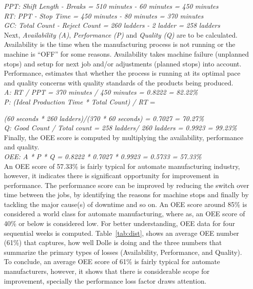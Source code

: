 \documentclass[runningheads]{llncs}
\begin{document}
\emph{PPT: Shift Length - Breaks = 510 minutes - 60 minutes = 450 minutes}\\

\emph{RT: PPT - Stop Time = 450 minutes - 80 minutes = 370 minutes}\\

\emph{GC: Total Count - Reject Count = 260 ladders - 2 ladder = 258 ladders} \\


Next, \emph{Availability (A)}, \emph{Performance (P)} and \emph{Quality (Q)} are to be calculated. Availability is the time when the manufacturing process is not running or the machine is ``OFF'' for some reasons. Availability takes machine failure (unplanned stops) and setup for next job and/or adjustments (planned stops) into account. Performance, estimates that whether the process is running at its optimal pace and quality concerns with quality standards of the products being produced.\\


\emph{A: RT / PPT = 370 minutes / 450 minutes = 0.8222 = 82.22\%}\\

\emph{P: (Ideal Production Time * Total Count) / RT} = 

\hspace{12mm} \emph{(60 seconds * 260 ladders)/(370 * 60 seconds) = 0.7027 = 70.27\%}\\

\emph{Q: Good Count / Total count = 258 ladders/ 260 ladders = 0.9923 = 99.23\%}\\

Finally, the OEE score is computed by multiplying the availability, performance and quality.\\ 

\emph{OEE: A * P * Q = 0.8222 * 0.7027 * 0.9923 = 0.5733 = 57.33\%}\\

An OEE score of 57.33\% is fairly typical for automate manufacturing industry, however, it indicates there is significant opportunity for improvement in performance. The performance score can be improved by reducing the switch over time between the jobs, by identifying the reasons for machine stops and finally by tackling the major cause(s) of downtime and so on. An OEE score around 85\% is considered a world class for automate manufacturing, where as, an OEE score of 40\% or below is considered low. For better understanding, OEE data for four sequential weeks is computed. Table~\ref{tab:dist}, shows an average OEE number (61\%) that captures, how well Dolle is doing and the three numbers that summarize the primary types of losses (Availability, Performance, and Quality). To conclude, an average OEE score of 61\% is fairly typical for automate manufacturers, however, it shows that there is considerable scope for improvement, specially the performance loss factor draws attention.
\end{document}
